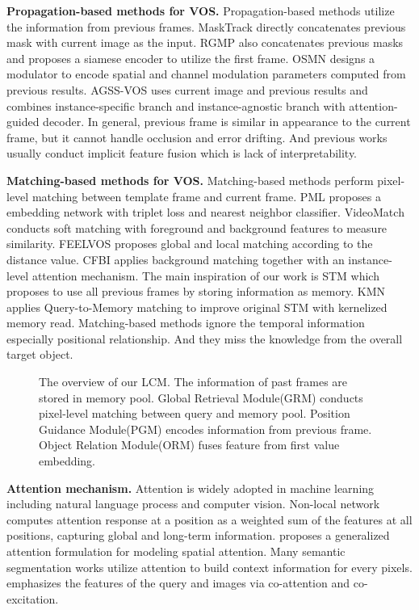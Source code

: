 \documentclass[final]{cvpr}
\begin{document}
\textbf{Propagation-based methods for VOS. }
Propagation-based methods utilize the information from previous frames. MaskTrack\cite{MaskTrack} directly concatenates previous mask with current image as the input. RGMP\cite{rgmp} also concatenates previous masks and proposes a siamese encoder to utilize the first frame. OSMN\cite{osmn} designs a modulator to encode spatial and channel modulation parameters computed from previous results. AGSS-VOS\cite{agss-vos} uses current image and previous results and combines instance-specific branch and instance-agnostic branch with attention-guided decoder. 
In general, previous frame is similar in appearance to the current frame, but it cannot handle occlusion and error drifting. And previous works usually conduct implicit feature fusion which is lack of interpretability.

\textbf{Matching-based methods for VOS. }
Matching-based methods perform pixel-level matching between template frame and current frame.
PML\cite{PML} proposes a embedding network with triplet loss and nearest neighbor classifier. VideoMatch\cite{videomatch} conducts soft matching with foreground and background features to measure similarity. FEELVOS\cite{feelvos} proposes global and local matching according to the distance value. CFBI\cite{cfbi} applies background matching together with an instance-level attention mechanism. The main inspiration of our work is STM\cite{STM} which proposes to use all previous frames by storing information as memory. 
KMN\cite{KMN} applies Query-to-Memory matching to improve original STM with kernelized memory read.
Matching-based methods ignore the temporal information especially positional relationship. And they miss the knowledge from the overall target object. 


\begin{figure*}[!t]
\begin{center}
	\setlength{\fboxrule}{0pt}
\end{center}
\caption{The overview of our LCM. The information of past frames are stored in memory pool. Global Retrieval Module(GRM) conducts pixel-level matching between query and memory pool. Position Guidance Module(PGM) encodes information from previous frame. Object Relation Module(ORM) fuses feature from first value embedding. }
\label{fig:overview}
\end{figure*}




\textbf{Attention mechanism.}
Attention is widely adopted in machine learning including natural language process and computer vision. 
Non-local\cite{nonlocal} network computes attention response at a position as a weighted sum of the features at all positions, capturing global and long-term information. \cite{empirical} proposes a generalized attention formulation for modeling spatial attention. Many semantic segmentation works\cite{ccnet,psanet,OCR} utilize attention to build context information for every pixels.
\cite{hsieh2019one} emphasizes the features of the query and images via co-attention and co-excitation.
\end{document}
